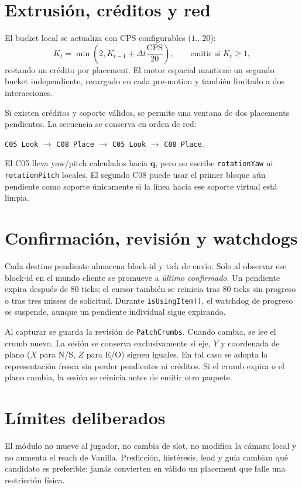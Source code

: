 \documentclass[11pt,a4paper]{article}
\begin{document}
\section{Extrusión, créditos y red}

El bucket local se actualiza con CPS configurables ($1\ldots20$):
\begin{equation}
 K_t=\min\left(2,K_{t-1}+\Delta t\frac{\mathrm{CPS}}{20}\right),
 \qquad \text{emitir si }K_t\geq1,
\end{equation}
restando un crédito por placement. El motor espacial mantiene un segundo bucket
independiente, recargado en cada pre-motion y también limitado a dos interacciones.

Si existen créditos y soporte válidos, se permite una ventana de dos placements
pendientes. La secuencia se conserva en orden de red:
\begin{center}
\texttt{C05 Look} $\rightarrow$ \texttt{C08 Place} $\rightarrow$
\texttt{C05 Look} $\rightarrow$ \texttt{C08 Place}.
\end{center}
El C05 lleva yaw/pitch calculados hacia $\mathbf q$, pero no escribe
\texttt{rotationYaw} ni \texttt{rotationPitch} locales. El segundo C08 puede usar
el primer bloque aún pendiente como soporte únicamente si la línea hacia ese
soporte virtual está limpia.

\section{Confirmación, revisión y watchdogs}

Cada destino pendiente almacena block-id y tick de envío. Solo al observar ese
block-id en el mundo cliente se promueve a \emph{último confirmado}. Un pendiente
expira después de $80$ ticks; el cursor también se reinicia tras $80$ ticks sin
progreso o tras tres misses de solicitud. Durante \texttt{isUsingItem()}, el
watchdog de progreso se suspende, aunque un pendiente individual sigue expirando.

Al capturar se guarda la revisión de \texttt{PatchCrumbs}. Cuando cambia, se lee
el crumb nuevo. La sesión se conserva exclusivamente si eje, $Y$ y coordenada de
plano ($X$ para N/S, $Z$ para E/O) siguen iguales. En tal caso se adopta la
representación fresca sin perder pendientes ni créditos. Si el crumb expira o el
plano cambia, la sesión se reinicia antes de emitir otro paquete.

\section{Límites deliberados}

El módulo no mueve al jugador, no cambia de slot, no modifica la cámara local y
no aumenta el reach de Vanilla. Predicción, histéresis, lead y guía cambian qué
candidato es preferible; jamás convierten en válido un placement que falle una
restricción física.
\end{document}
